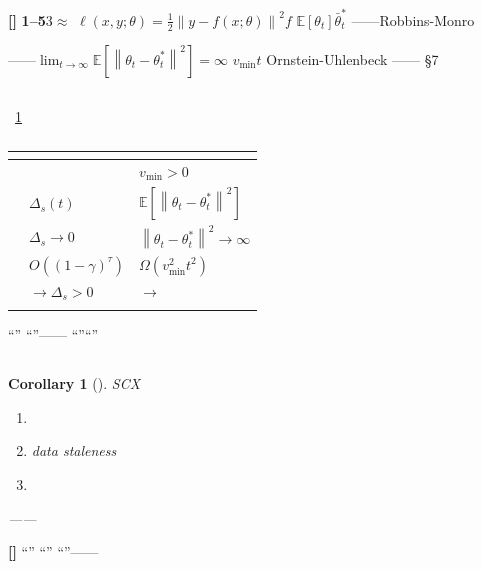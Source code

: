 \documentclass[11pt,a4paper]{article}
\newtheorem{corollary}[theorem]{Corollary}
\theoremstyle{remark}
\newcommand{\E}{\mathbb{E}}
\newcommand{\norm}[1]{\left\lVert#1\right\rVert}
\newcommand{\rigorous}{\textnormal{\textbf{[]}}}
\newcommand{\heuristic}{\textnormal{\textbf{[]}}}
\begin{document}
\rigorous{} \textbf{1--5}3$\approx$
$\ell(x, y; \theta) = \frac{1}{2}\norm{y - f(x;\theta)}^2$$f$
$\E[\theta_t]$$\bar{\theta}_t^*$
——Robbins-Monro


\textbf{}——$\lim_{t \to \infty} \E[\norm{\theta_t - \theta_t^*}^2] = \infty$
$v_{\min}$$t$
\textbf{}Ornstein-Uhlenbeck
——
\S7

\subsection{}

~\ref{tab:economy_forgetting}


\begin{table}[htbp]
\centering
\caption{}
\label{tab:economy_forgetting}
\begin{tabular}{@{}lll@{}}
\toprule
\textbf{} & \textbf{} & \textbf{} \\
\midrule
 &  & $v_{\min} > 0$ \\
 & $\Delta_s(t)$ & $\E[\norm{\theta_t - \theta_t^*}^2]$ \\
 & $\Delta_s \to 0$ & $\norm{\theta_t - \theta_t^*}^2 \to \infty$ \\
 & $O((1-\gamma)^\tau)$ & $\Omega(v_{\min}^2 t^2)$ \\
 & $\to \Delta_s > 0$ & $\to$ \\
 &  &  \\
\bottomrule
\end{tabular}
\end{table}

``''
``''——
\textbf{}
``''``''

\subsection{}

\begin{corollary}[]\label{cor:design_necessity}
SCX\textbf{}
\begin{enumerate}[label=(\arabic*)]
    \item 
    \item data staleness
    \item 
\end{enumerate}
——\textbf{}
\end{corollary}

\heuristic{} \textbf{}``''
\textbf{}``''
``''——

\end{document}
